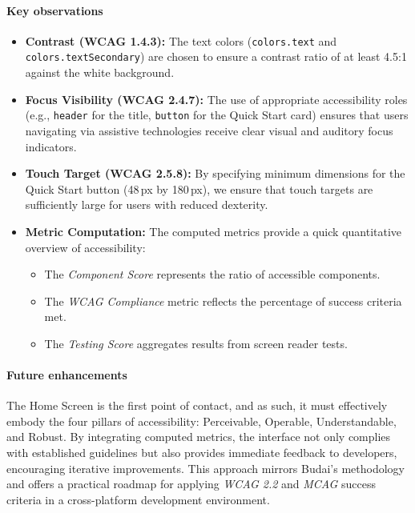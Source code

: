 \paragraph{Key observations}
\begin{itemize}
    \item \textbf{Contrast (WCAG 1.4.3):} The text colors (\texttt{colors.text} and \\\texttt{colors.textSecondary}) are chosen to ensure a contrast ratio of at least 4.5:1 against the white background.
    \item \textbf{Focus Visibility (WCAG 2.4.7):} The use of appropriate accessibility roles (e.g., \texttt{header} for the title, \texttt{button} for the Quick Start card) ensures that users navigating via assistive technologies receive clear visual and auditory focus indicators.
    \item \textbf{Touch Target (WCAG 2.5.8):} By specifying minimum dimensions for the Quick Start button (48\,px by 180\,px), we ensure that touch targets are sufficiently large for users with reduced dexterity.
    \item \textbf{Metric Computation:} The computed metrics provide a quick quantitative overview of accessibility:
    \begin{itemize}
        \item The \textit{Component Score} represents the ratio of accessible components.
        \item The \textit{WCAG Compliance} metric reflects the percentage of success criteria met.
        \item The \textit{Testing Score} aggregates results from screen reader tests.
    \end{itemize}
\end{itemize}

\paragraph{Future enhancements}
The Home Screen is the first point of contact, and as such, it must effectively embody the four pillars of accessibility: Perceivable, Operable, Understandable, and Robust. By integrating computed metrics, the interface not only complies with established guidelines but also provides immediate feedback to developers, encouraging iterative improvements. This approach mirrors Budai’s methodology \cite{budai2024mobile} and offers a practical roadmap for applying \textit{WCAG 2.2} and \textit{MCAG} success criteria in a cross-platform development environment.

